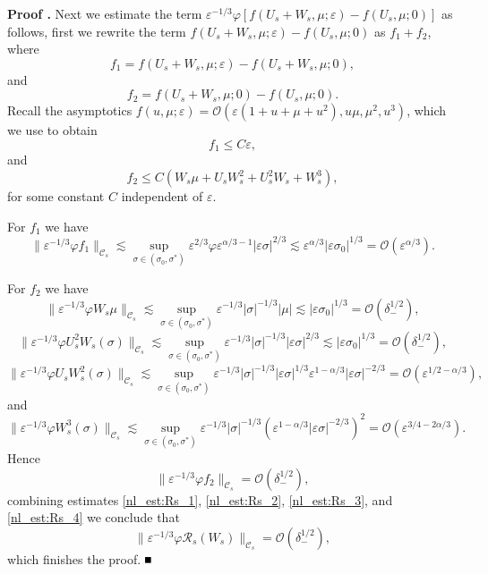 \documentclass[letterpaper,11pt]{article}
\newcommand{\rmO}{\mathcal{O}}
\newcommand{\eps}{\varepsilon}
\newcommand{\lar}{ \lesssim }
\newcommand{\Ral}{\mathcal{R}}
\numberwithin{equation}{section}
\theoremstyle{plain}
\newenvironment{Proof}[1][\unskip]%
 {\begin{trivlist} \item[]{\bf Proof #1. }}%
 {\hspace*{\fill}$\rule{.4\baselineskip}{.4\baselineskip}$\end{trivlist}}
\begin{document}
\begin{Proof}
Next we estimate the term $\eps^{-1/3}\varphi[ f(U_s+W_s, \mu; \eps)-f(U_s,\mu; 0) ]$ as follows, first we rewrite the term $f(U_s+W_s,\mu;\eps)-f(U_s,\mu;0)$ as $f_1 + f_2$, where
\[
f_1 = f(U_s+W_s,\mu;\eps) - f(U_s+W_s,\mu;0),
\]
and 
\[
f_2 = f(U_s+W_s,\mu;0)  - f(U_s, \mu; 0).
\]
Recall the asymptotics $f(u,\mu ; \eps) = \rmO(\eps(1+u+\mu+u^2), u\mu,\mu^2,u^3)$, which we use to obtain
\[
f_1 \le C\eps,
\]
and 
\[
f_2 \le C( W_s\mu + U_sW_s^2+U_s^2W_s+W_s^3),
\]
for some constant $C$ independent of $\eps$.

For $f_1$ we have
\begin{equation}\label{nl_est:Rs_3}
\| \eps^{-1/3}\varphi f_1\|_{\mathcal{C}_s} \lar \sup_{\sigma \in (\sigma_0, \sigma^{*})} \eps^{2/3}\varphi \eps^{\alpha/3-1}|\eps\sigma|^{2/3} \lar \eps^{\alpha/3}|\eps\sigma_0|^{1/3} = \rmO(\eps^{\alpha/3}).
\end{equation}

For $f_2$ we have
\[
\|\eps^{-1/3}\varphi W_s\mu\|_{\mathcal{C}_s} \lar \sup_{\sigma \in (\sigma_0, \sigma^{*})} \eps^{-1/3}|\sigma|^{-1/3}|\mu| \lar |\eps \sigma_0|^{1/3} = \rmO(\delta_-^{1/2}),
\]
\[
\|\eps^{-1/3}\varphi U_s^2W_s(\sigma) \|_{\mathcal{C}_s}  \lar \sup_{\sigma \in (\sigma_0, \sigma^{*})}\eps^{-1/3}|\sigma|^{-1/3} |\eps \sigma|^{2/3} \lar |\eps \sigma_0|^{1/3}= \rmO(\delta_-^{1/2}),
\]
\[
\|\eps^{-1/3}\varphi U_sW_s^2(\sigma) \|_{\mathcal{C}_s}  \lar \sup_{\sigma \in (\sigma_0, \sigma^{*})}\eps^{-1/3}|\sigma|^{-1/3} |\eps \sigma|^{1/3}\eps^{1-\alpha/3}|\eps\sigma|^{-2/3} = \rmO(\eps^{1/2-\alpha/3}),
\]
and
\[
\|\eps^{-1/3}\varphi W_s^3(\sigma) \|_{\mathcal{C}_s}  \lar \sup_{\sigma \in (\sigma_0, \sigma^{*})}\eps^{-1/3}|\sigma|^{-1/3} (\eps^{1-\alpha/3}|\eps\sigma|^{-2/3})^2 = \rmO(\eps^{3/4-2\alpha/3}).
\]
Hence 
\begin{equation}\label{nl_est:Rs_4}
\|\eps^{-1/3}\varphi f_2\|_{\mathcal{C}_s} = \rmO(\delta_-^{1/2}),
\end{equation} 
combining estimates \eqref{nl_est:Rs_1}, \eqref{nl_est:Rs_2}, \eqref{nl_est:Rs_3}, and \eqref{nl_est:Rs_4} we conclude that 
\[
\|\eps^{-1/3}\varphi \Ral_s(W_s) \|_{\mathcal{C}_s} = \rmO(\delta_-^{1/2}),
\]
which finishes the proof.
\end{Proof}
\end{document}
